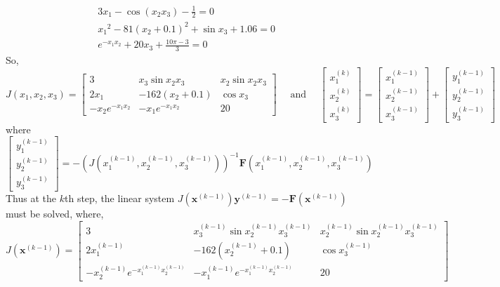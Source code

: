 \documentclass[../main-sheet.tex]{subfiles}
\begin{document}
\begin{ex}
    \begin{align*}
        &3x_1-\cos(x_2x_3)-\frac{1}{2}=0\\
        &{x_1}^2-81(x_2+0.1)^2+\sin x_3+1.06=0\\
        &e^{-x_1x_2}+20x_3+\frac{10\pi -3}{3}=0
    \end{align*}
    So,
    \[
        J(x_1,x_2,x_3)=\begin{bmatrix}
            3 & x_3 \sin x_2x_3 & x_2 \sin x_2 x_3\\
            2x_1 & -162(x_2+0.1) & \cos x_3\\
            -x_2e^{-x_1x_2} & -x_1e^{-x_1x_2} & 20
        \end{bmatrix}
        \quad\text{ and }\quad \begin{bmatrix}
            x_1^{(k)}\\
            x_2^{(k)}\\
            x_3^{(k)}
        \end{bmatrix}=\begin{bmatrix}
            x_1^{(k-1)}\\
            x_2^{(k-1)}\\
            x_3^{(k-1)}
        \end{bmatrix}+\begin{bmatrix}
            y_1^{(k-1)}\\
            y_2^{(k-1)}\\
            y_3^{(k-1)}
        \end{bmatrix}
    \]
    where 
    \[
        \begin{bmatrix}
            y_1^{(k-1)}\\
            y_2^{(k-1)}\\
            y_3^{(k-1)}
        \end{bmatrix}=-\left( J\left( x_1^{(k-1)},x_2^{(k-1)},x_3^{(k-1)} \right) \right)^{-1}\mathbf{F}\left( x_1^{(k-1)},x_2^{(k-1)},x_3^{(k-1)} \right)
    \]
    Thus at the \(k\)th step, the linear system \(J\left( \mathbf{x}^{(k-1)} \right)\mathbf{y}^{(k-1)}=-\mathbf{F}\left( \mathbf{x}^{(k-1)} \right)\) must be solved, where,
    \[
        J(\mathbf{x}^{(k-1)})=\begin{bmatrix}
            3 & x_3^{(k-1)} \sin x_2^{(k-1)}x_3^{(k-1)} & x_2^{(k-1)} \sin x_2^{(k-1)} x_3^{(k-1)}\\
            2x_1^{(k-1)} & -162(x_2^{(k-1)}+0.1) & \cos x_3^{(k-1)}\\
            -x_2^{(k-1)}e^{-x_1^{(k-1)}x_2^{(k-1)}} & -x_1^{(k-1)}e^{-x_1^{(k-1)}x_2^{(k-1)}} & 20

\end{bmatrix}\]
\end{ex}
\end{document}
